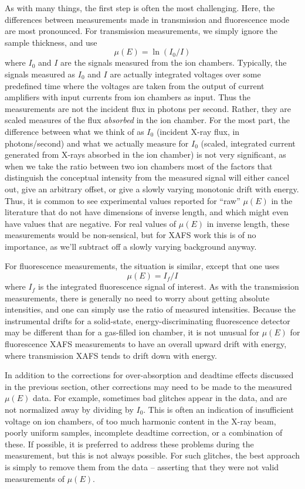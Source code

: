 As with many things, the first step is often the most challenging.  Here,
the differences between measurements made in  transmission and fluorescence
mode are most pronounced.   For transmission measurements, we simply ignore
the sample thickness, and use
\begin{equation}
  \mu(E) =\ln (I_0/I)
\end{equation}
\noindent where $I_0$ and $I$ are the signals measured from the ion
chambers.  Typically, the signals measured as $I_0$ and $I$ are actually
integrated voltages over some predefined time where the voltages are taken
from the output of current amplifiers with input currents from ion chambers
as input.  Thus the measurements are not the incident flux in photons per
second.  Rather, they are scaled measures of the flux {\emph{absorbed}} in
the ion chamber.  For the most part, the difference between what we think
of as $I_0$ (incident X-ray flux, in photons/second) and what we actually
measure for $I_0$ (scaled, integrated current generated from X-rays
absorbed in the ion chamber) is not very significant, as when we take the
ratio between two ion chambers most of the factors that distinguish the
conceptual intensity from the measured signal will either cancel out, give
an arbitrary offset, or give a slowly varying monotonic drift with energy.
Thus, it is common to see experimental values reported for ``raw'' $\mu(E)$
in the literature that do not have dimensions of inverse length,   and which
might even have values that are negative.  For real values of $\mu(E)$ in
inverse length,   these measurements would be non-sensical, but for XAFS work
this is of no importance, as we'll subtract off a slowly varying background
anyway.

For fluorescence measurements,  the situation is similar, except that one uses
\begin{equation}
  \mu(E) = I_f/I
\end{equation}
\noindent where $I_f$ is the integrated fluorescence signal of interest.
As with the transmission measurements, there is generally no need to worry
about getting absolute intensities, and one can simply use the ratio of
measured intensities.    Because the instrumental drifts for a solid-state,
energy-discriminating fluorescence detector may be different than for a
gas-filled ion chamber, it is not unusual for $\mu(E)$ for fluorescence XAFS
measurements to have an overall upward drift with energy, where
transmission XAFS tends to drift down with energy.

In addition to the corrections for over-absorption and deadtime effects
discussed in the previous section, other corrections may need to be made to
the measured $\mu(E)$ data.  For example, sometimes bad glitches appear in
the data, and are not normalized away by dividing by $I_0$.  This is often
an indication of insufficient voltage on ion chambers, of too much harmonic
content in the X-ray beam, poorly uniform samples, incomplete deadtime
correction, or a combination of these.  If possible, it is preferred to
address these problems during the measurement, but this is not always
possible.  For such glitches, the best approach is simply to remove them
from the data -- asserting that they were not valid measurements of
$\mu(E)$.

